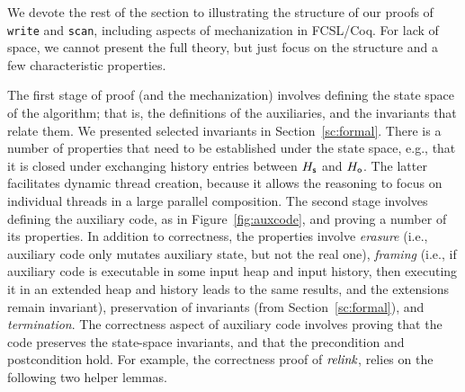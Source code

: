 
\def\tleqP{\mathrel{\leq_{\ordlist'}}}
\def\tleP{\mathrel{<_{\ordlist'}}}
\def\jleqP{\mathrel{\sqsubseteq_{\ordlist'}}}

We devote the rest of the section to illustrating the structure of our
proofs of {\tt write} and {\tt scan}, including aspects of
mechanization in FCSL/Coq. For lack of space, we cannot present the
full theory, but just focus on the structure and a few characteristic
properties.

The first stage of proof (and the mechanization) involves defining the
state space of the algorithm; that is, the definitions of the
auxiliaries, and the invariants that relate them. We presented
selected invariants in Section~\ref{sc:formal}. There is a number of
properties that need to be established under the state space, e.g.,
that it is closed under exchanging history entries between $H_{\mathsf{s}}$
and $H_{\mathsf{o}}$. The latter facilitates dynamic thread creation, because
it allows the reasoning to focus on individual threads in a large
parallel composition.
%
The second stage involves defining the auxiliary code, as in
Figure~\ref{fig:auxcode}, and proving a number of its properties. In
addition to correctness, the properties involve \emph{erasure} (i.e.,
auxiliary code only mutates auxiliary state, but not the real
one), \emph{framing} (i.e., if auxiliary code is executable in some
input heap and input history, then executing it in an extended heap
and history leads to the same results, and the extensions remain
invariant), preservation of invariants (from Section~\ref{sc:formal}),
and \emph{termination}. The correctness aspect of auxiliary code
involves proving that the code preserves the state-space invariants,
and that the precondition and postcondition hold. For example, the
correctness proof of $\textit{relink}$, relies on the following two
helper lemmas.


